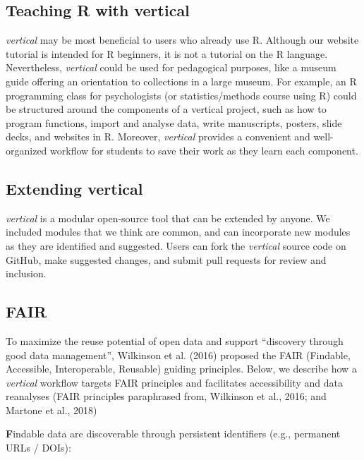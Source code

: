 \documentclass[
  english,
  jou,floatsintext]{apa6}
\begin{document}
\hypertarget{teaching-r-with-vertical}{%
\subsection{Teaching R with vertical}\label{teaching-r-with-vertical}}

\emph{vertical} may be most beneficial to users who already use R. Although our website tutorial is intended for R beginners, it is not a tutorial on the R language. Nevertheless, \emph{vertical} could be used for pedagogical purposes, like a museum guide offering an orientation to collections in a large museum. For example, an R programming class for psychologists (or statistics/methods course using R) could be structured around the components of a vertical project, such as how to program functions, import and analyse data, write manuscripts, posters, slide decks, and websites in R. Moreover, \emph{vertical} provides a convenient and well-organized workflow for students to save their work as they learn each component.

\hypertarget{extending-vertical}{%
\subsection{Extending vertical}\label{extending-vertical}}

\emph{vertical} is a modular open-source tool that can be extended by anyone. We included modules that we think are common, and can incorporate new modules as they are identified and suggested. Users can fork the \emph{vertical} source code on GitHub, make suggested changes, and submit pull requests for review and inclusion.

\hypertarget{fair}{%
\subsection{FAIR}\label{fair}}

To maximize the reuse potential of open data and support ``discovery through good data management'', Wilkinson et al. (2016) proposed the FAIR (Findable, Accessible, Interoperable, Reusable) guiding principles. Below, we describe how a \emph{vertical} workflow targets FAIR principles and facilitates accessibility and data reanalyses (FAIR principles paraphrased from, Wilkinson et al., 2016; and Martone et al., 2018)

\textbf{F}indable data are discoverable through persistent identifiers (e.g., permanent URLs / DOIs):
\end{document}
